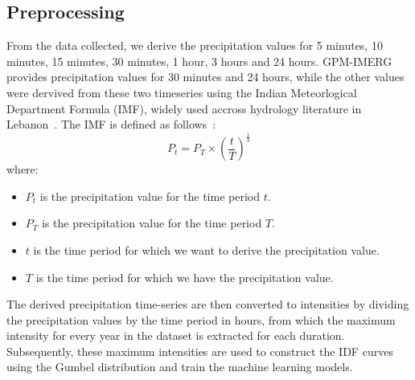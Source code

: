 \subsection{Preprocessing}
From the data collected, we derive the precipitation values for 5 minutes, 10 minutes, 15 minutes, 30 minutes, 1 hour, 3 hours and 24 hours. GPM-IMERG provides precipitation values for 30 minutes and 24 hours, while the other values were dervived from these two timeseries using the Indian Meteorlogical Department Formula (IMF), widely used accross hydrology literature in Lebanon~\cite{}.%
The IMF is defined as follows~\cite{}:
\begin{equation}
P_{t} = P_{T} \times {\left(\frac{t}{T}\right)}^{\frac{1}{3}}
\end{equation}
where:
\begin{itemize}
  \item $P_{t}$ is the precipitation value for the time period $t$.
  \item $P_{T}$ is the precipitation value for the time period $T$.
  \item $t$ is the time period for which we want to derive the precipitation value.
  \item $T$ is the time period for which we have the precipitation value.
\end{itemize}
The derived precipitation time-series are then converted to intensities by dividing the precipitation values by the time period in hours, from which the maximum intensity for every year in the dataset is extracted for each duration. Subsequently, these maximum intensities are used to construct the IDF curves using the Gumbel distribution and train the machine learning models.